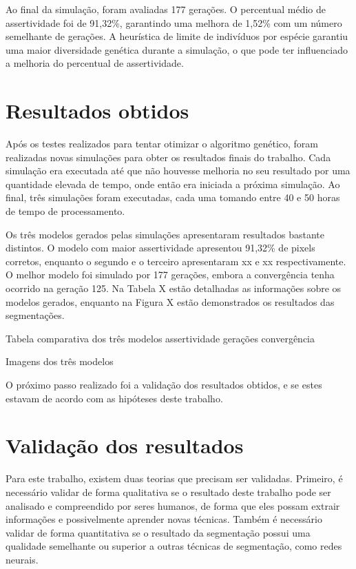 \documentclass[12pt,oneside,a4paper,english,french,spanish,brazil,]{abntex2}
\begin{document}
Ao final da simulação, foram avaliadas 177 gerações. O percentual médio de assertividade foi de 91,32\%, garantindo uma melhora de 1,52\% com um número semelhante de gerações. A heurística de limite de indivíduos por espécie garantiu uma maior diversidade genética durante a simulação, o que pode ter influenciado a melhoria do percentual de assertividade.

\section{Resultados obtidos}


Após os testes realizados para tentar otimizar o algoritmo genético, foram realizadas novas simulações para obter os resultados finais do trabalho. Cada simulação era executada até que não houvesse melhoria no seu resultado por uma quantidade elevada de tempo, onde então era iniciada a próxima simulação. Ao final, três simulações foram executadas, cada uma tomando entre 40 e 50 horas de tempo de processamento.

Os três modelos gerados pelas simulações apresentaram resultados bastante distintos. O modelo com maior assertividade apresentou 91,32\% de pixels corretos, enquanto o segundo e o terceiro apresentaram xx e xx respectivamente. O melhor modelo foi simulado por 177 gerações, embora a convergência tenha ocorrido na geração 125. Na Tabela X estão detalhadas as informações sobre os modelos gerados, enquanto na Figura X estão demonstrados os resultados das segmentações.


Tabela comparativa dos três modelos
   assertividade
   gerações
   convergência
   
Imagens dos três modelos

O próximo passo realizado foi a validação dos resultados obtidos, e se estes estavam de acordo com as hipóteses deste trabalho.

\section{Validação dos resultados}

Para este trabalho, existem duas teorias que precisam ser validadas. Primeiro, é necessário validar de forma qualitativa se o resultado deste trabalho pode ser analisado e compreendido por seres humanos, de forma que eles possam extrair informações e possivelmente aprender novas técnicas. Também é necessário validar de forma quantitativa se o resultado da segmentação possui uma qualidade semelhante ou superior a outras técnicas de segmentação, como redes neurais.
\end{document}
